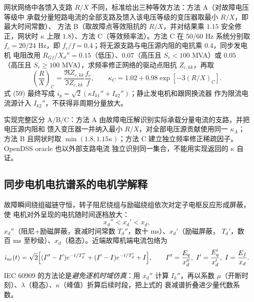\begin{remark}
网状网络中各馈入支路 $R/X$ 不同，标准给出三种等效方法：方法 A（对故障电压等级中
承载分量短路电流的全部支路及馈入该电压等级的变压器取最小 $R/X$，即最大时间常数）、
方法 B（取故障点等效阻抗的 $R/X$，并对结果乘 $1.15$ 安全修正，网状时
$\kappa$ 上限 $1.8$）、方法 C（等效频率法）。方法 C 在 50/60 Hz 系统分别取
$f_c=20/24$ Hz，即 $f_c/f=0.4$；将无源支路与电压源内阻的电抗乘 $0.4$，同步发电机
电阻改用 $R_{Gf}/X_d''=0.15$（低压）、$0.07$（高压且 $S_r<100$ MVA）或 $0.05$
（高压且 $S_r\ge100$ MVA），求频率修正网络的驱动点阻抗 $Z_{c,kk}$，再取
\begin{equation}
  \left(\frac RX\right)_C=\frac{\Re Z_{c,kk}}{\Im Z_{c,kk}}\frac{f_c}{f},\qquad
  \kappa_C=1.02+0.98\exp\!\left[-3(R/X)_C\right].
\end{equation}
式 (59) 最终写成 $i_p=\sqrt2(\kappa I_{k1}''+I_{k2}'')$；静止发电机和跟网换流器
作为限流电流源计入 $I_{k2}''$，不获得非周期分量放大。
\end{remark}

\begin{theorynote}
实现完整区分 A/B/C：方法 A 由故障电压解识别实际承载分量电流的支路，并把电压源内阻和
馈入变压器一并纳入最小 $R/X$，对全部电压源贡献使用同一 $\kappa_A$；方法 B 且网状时取
$\min(1.8,1.15\kappa)$；方法 C 建立独立频率修正稀疏因子。OpenDSS oracle 也以外部支路电流
独立识别同一集合，不能用实现返回的 $\kappa$ 自证。
\end{theorynote}

\subsection{同步电机电抗谱系的电机学解释}
故障瞬间绕组磁链守恒，转子阻尼绕组与励磁绕组依次对定子电枢反应形成屏蔽，使
电机对外呈现的电抗随时间逐档放大：
\begin{equation}
x_d''<x_d'<x_d,
\end{equation}
$x_d''$（阻尼+励磁屏蔽，衰减时间常数 $T_d''$，数十 ms）、$x_d'$（励磁屏蔽，
$T_d'$，数百 ms 至秒级）、$x_d$（稳态）。近端故障机端电流包络为
\begin{equation}
i_{ac}(t)=\sqrt2\Bigl[(I''-I')e^{-t/T_d''}+(I'-I)e^{-t/T_d'}+I\Bigr],
\qquad I''=\frac{E_q}{x_d''},\ I'=\frac{E_q'}{x_d'},\ I=\frac{E_f}{x_d}.
\end{equation}
IEC 60909 的方法论是\emph{避免逐机时域仿真}：用 $x_d''$ 计算 $I_k''$，再以系数
$\mu$（开断时刻）、$\lambda$（稳态）、$\kappa$（峰值）折算后续时段，把上式的
衰减谱折叠进少量代数系数。

